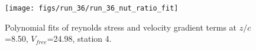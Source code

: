 \begin{figure}[H]
\centering
\texttt{[image: figs/run\_36/run\_36\_nut\_ratio\_fit]}
\caption{Polynomial fits of reynolds stress and velocity gradient terms at $z/c$=8.50, $V_{free}$=24.98, station 4.}
\label{fig:run_36_nut_ratio_fit}
\end{figure}


